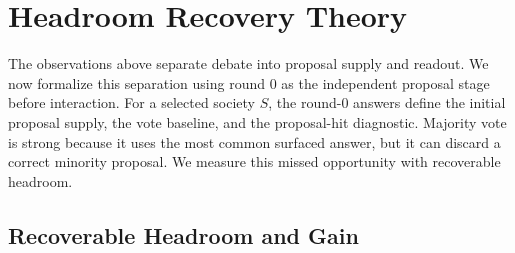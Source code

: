 \documentclass{article}
\begin{document}
\section{Headroom Recovery Theory}
\label{sec:headroom_lvd}

The observations above separate debate into proposal supply and readout. We now
formalize this separation using round $0$ as the independent proposal stage
before interaction. For a selected society $S$, the round-0 answers define the
initial proposal supply, the vote baseline, and the proposal-hit diagnostic.
Majority vote is strong because it uses the most common surfaced answer, but it
can discard a correct minority proposal. We measure this missed opportunity with
recoverable headroom.

\subsection{Recoverable Headroom and Gain}
\label{subsec:headroom_accounting}
\label{subsec:recovery_damage_decomposition}
\end{document}
